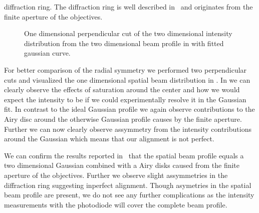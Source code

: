 diffraction ring. The diffraction ring is well described
in~\cite{Hertlein2017} and originates from the finite aperture of the
objectives.
\begin{figure}[htb]
  \centering
  \begin{adjustbox}{width=\textwidth}
    
  \end{adjustbox}
  \caption{One dimensional perpendicular cut of the two dimensional intensity
    distribution from the two dimensional beam profile in
     with fitted gaussian curve.
  }\label{fig:intensity_spatial_profile}
\end{figure}
For better comparison of the radial symmetry we performed two perpendicular
cuts and visualized the one dimensional spatial beam distribution in
.
In  we can clearly observe the effects of
saturation around the center and how we would expect the intensity to be
if we could experimentally resolve it in the Gaussian fit. In contrast to the
ideal Gaussian profile we again observe contributions to the Airy disc around
the otherwise Gaussian profile causes by the finite aperture. Further we can
now clearly observe assymmetry from the intensity contributions around the
Gaussian which means that our alignment is not perfect.

We can confirm the results reported in~\cite{Hertlein2017} that the spatial
beam profile equals a two dimensional Gaussian combined with a Airy disks
caused from the finite aperture of the objectives. Further we observe
slight assymmetries in the diffraction ring suggesting inperfect alignment.
Though asymetries in the spatial beam profile are present, we do not see any
further complications as the intensity measurements with the photodiode will
cover the complete beam profile.
